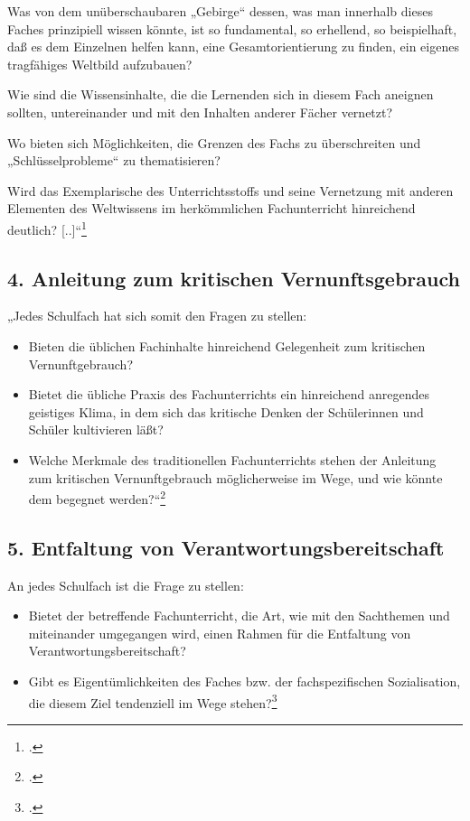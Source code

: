 \documentclass{lehramt-informatik-haupt}
\begin{document}
Was von dem unüberschaubaren „Gebirge“ dessen, was man innerhalb dieses
Faches prinzipiell wissen könnte, ist so fundamental, so erhellend, so
beispielhaft, daß es dem Einzelnen helfen kann, eine Gesamtorientierung
zu finden, ein eigenes tragfähiges Weltbild aufzubauen?

Wie sind die Wissensinhalte, die die Lernenden sich in diesem Fach
aneignen sollten, untereinander und mit den Inhalten anderer Fächer
vernetzt?

Wo bieten sich Möglichkeiten, die Grenzen des Fachs zu überschreiten und
„Schlüsselprobleme“ zu thematisieren?

Wird das Exemplarische des Unterrichtsstoffs und seine Vernetzung mit
anderen Elementen des Weltwissens im herkömmlichen Fachunterricht
hinreichend deutlich? [..]“\footcite[Seite 7]{ddi:fs:1}

%

\subsection{4. Anleitung zum kritischen Vernunftsgebrauch}

„Jedes Schulfach hat sich somit den Fragen zu stellen:

\begin{itemize}
\item Bieten die üblichen Fachinhalte hinreichend Gelegenheit zum
kritischen Vernunftgebrauch?

\item Bietet die übliche Praxis des Fachunterrichts ein hinreichend
anregendes geistiges Klima, in dem sich das kritische Denken der
Schülerinnen und Schüler kultivieren läßt?

\item Welche Merkmale des traditionellen Fachunterrichts stehen der
Anleitung zum kritischen Vernunftgebrauch möglicherweise im Wege, und
wie könnte dem begegnet werden?“\footcite[Seite 8]{ddi:fs:1}
\end{itemize}

%

\subsection{5. Entfaltung von Verantwortungsbereitschaft}

An jedes Schulfach ist die Frage zu stellen:

\begin{itemize}
\item Bietet der betreffende Fachunterricht, die Art, wie mit den
Sachthemen und miteinander umgegangen wird, einen Rahmen für die
Entfaltung von Verantwortungsbereitschaft?

\item Gibt es Eigentümlichkeiten des Faches bzw. der fachspezifischen
Sozialisation, die diesem Ziel tendenziell im Wege stehen?\footcite[Seite 9]{ddi:fs:1}
\end{itemize}
\end{document}
